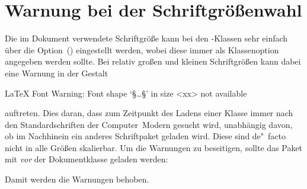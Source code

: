 \section{Warnung bei der Schriftgrößenwahl}
%
%
Die im Dokument verwendete Schriftgröße kann bei den \KOMAScript-Klassen sehr 
einfach über die Option~() eingestellt 
werden, wobei diese immer als Klassenoption angegeben werden sollte. Bei 
relativ großen und kleinen Schriftgrößen kann dabei eine Warnung in der Gestalt 
%
\begin{quoting}[rightmargin=0pt]
\begin{Code}[escapechar=§]
LaTeX Font Warning: Font shape `§\dots§' in size <xx> not available
\end{Code}
\end{quoting}
%
auftreten. Dies daran, dass zum Zeitpunkt des Ladens einer Klasse immer nach 
den Standardschriften der Computer~Modern gesucht wird, unabhängig davon, ob im 
Nachhinein ein anderes Schriftpaket geladen wird. Diese sind de"~facto nicht 
in alle Größen skalierbar. Um die Warnungen zu beseitigen, sollte das Paket 
 mit  \emph{vor} der Dokumentklasse 
geladen werden:
%
\begin{quoting}[rightmargin=0pt]
\end{quoting}
%
Damit werden die Warnungen behoben.



